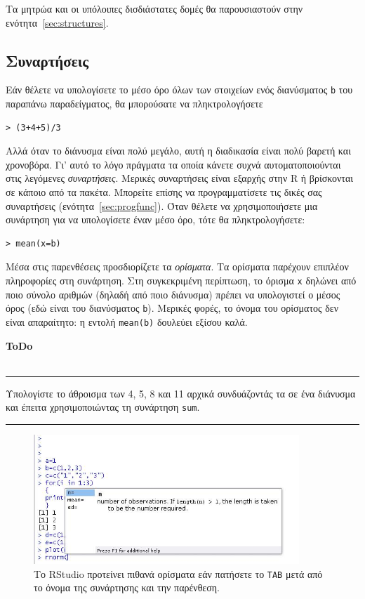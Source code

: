 \documentclass[a4paper,10pt,twocolumn]{article}
\newenvironment{ToDo} {
  \begin{flushright}
    \hfill
    \begin{minipage}{0.9\columnwidth}
    \textsf{\textbf{ToDo}} \\
      \vspace{-0.7cm}\\
      {\color{Gray}\rule[-0.05cm]{\columnwidth}{1.5pt}}} {
      {\color{Gray}\rule[0.3cm]{\columnwidth}{1.5pt}}
    \end{minipage}
    \vspace{0.3cm}
  \end{flushright}
  }
\begin{document}
Τα μητρώα και οι υπόλοιπες δισδιάστατες δομές θα παρουσιαστούν στην ενότητα~\ref{sec:structures}.

\subsection{Συναρτήσεις}

Εάν θέλετε να υπολογίσετε το μέσο όρο όλων των στοιχείων ενός διανύσματος \texttt{b} του παραπάνω παραδείγματος,
θα μπορούσατε να πληκτρολογήσετε 
\begin{Verbatim}[frame=single,gobble=0]
> (3+4+5)/3
\end{Verbatim}
Αλλά όταν το διάνυσμα είναι πολύ μεγάλο, αυτή η διαδικασία είναι πολύ βαρετή και χρονοβόρα. Γι' αυτό το λόγο
πράγματα τα οποία κάνετε συχνά αυτοματοποιούνται στις λεγόμενες \emph{συναρτήσεις}. Μερικές συναρτήσεις είναι 
εξαρχής στην R ή βρίσκονται σε κάποιο από τα πακέτα. Μπορείτε επίσης να προγραμματίσετε τις δικές σας 
συναρτήσεις (ενότητα~\ref{sec:progfunc}). Όταν θέλετε να χρησιμοποιήσετε μια συνάρτηση για να υπολογίσετε έναν
μέσο όρο, τότε θα πληκτρολογήσετε:
\begin{Verbatim}[frame=single,gobble=0]
> mean(x=b)
\end{Verbatim}

Μέσα στις παρενθέσεις προσδιορίζετε τα \emph{ορίσματα}. Τα ορίσματα παρέχουν επιπλέον πληροφορίες στη 
συνάρτηση. Στη συγκεκριμένη περίπτωση, το όρισμα \texttt{x} δηλώνει από ποιο σύνολο αριθμών (δηλαδή από ποιο
διάνυσμα) πρέπει να υπολογιστεί ο μέσος όρος (εδώ είναι του διανύσματος \texttt{b}). Μερικές φορές, το όνομα
του ορίσματος δεν είναι απαραίτητο: η εντολή \texttt{mean(b)} δουλεύει εξίσου καλά.

\begin{ToDo}
Υπολογίστε το άθροισμα των 4, 5, 8 και 11 αρχικά συνδυάζοντάς τα σε ένα διάνυσμα και έπειτα χρησιμοποιώντας
τη συνάρτηση \texttt{sum}.\\
\end{ToDo}

\begin{figure}[htb]
  \centering
  \includegraphics[width=10cm, clip=true, trim=0cm 0cm 0cm 1cm]{img/tab_RStudio.jpg}
  \caption{Το RStudio προτείνει πιθανά ορίσματα εάν πατήσετε το \texttt{TAB} μετά από το όνομα της συνάρτησης
  και την παρένθεση.}
  \label{fig:tab_RStudio}
\end{figure}
\end{document}
